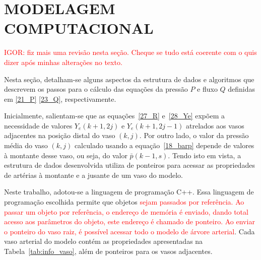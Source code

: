 \documentclass[a4paper,12pt]{monografia}
\theoremstyle{plain}
\theoremstyle{definition}
\theoremstyle{remark}
\begin{document}
\section{MODELAGEM COMPUTACIONAL}
\label{sec:algoritmo}
\textcolor{red}{IGOR: fiz mais uma revisão nesta seção. Cheque se tudo está coerente com o quis dizer após minhas alterações no texto.}

Nesta seção, detalham-se alguns aspectos da estrutura de dados e algoritmos que descrevem os passos para o cálculo das equações da pressão $P$ e fluxo $Q$ definidas em \eqref{21_P} \eqref{23_Q}, respectivamente.

Inicialmente, salientam-se que as equações~\eqref{27_R} e~\eqref{28_Ye} expõem a necessidade de valores $Y_e(k+1,2j)$ e $Y_e(k+1,2j-1)$ atrelados aos vasos adjacentes na posição distal do vaso $(k,j)$. Por outro lado, o valor da pressão média do vaso $(k,j)$ calculado usando a equação~\eqref{18_barp} depende de valores  à montante desse vaso, ou seja, do valor $\bar{p}(k-1,s)$. Tendo isto em vista, a estrutura de dados desenvolvida utiliza de ponteiros para acessar as propriedades de artérias à montante e a jusante de um vaso do modelo.

Neste trabalho, adotou-se a linguagem de programação C++. Essa linguagem de programação escolhida permite que objetos \textcolor{red}{sejam passados por referência. Ao passar um objeto por referência, o endereço de memória é enviado, dando total acesso aos parâmetros do objeto, este endereço é chamado de ponteiro. Ao enviar o ponteiro do vaso raiz, é possível acessar todo o modelo de árvore arterial}. Cada vaso arterial do modelo contém as propriedades apresentadas na Tabela~\ref{tab:info_vaso}, além de ponteiros para os vasos adjacentes. 
\end{document}
